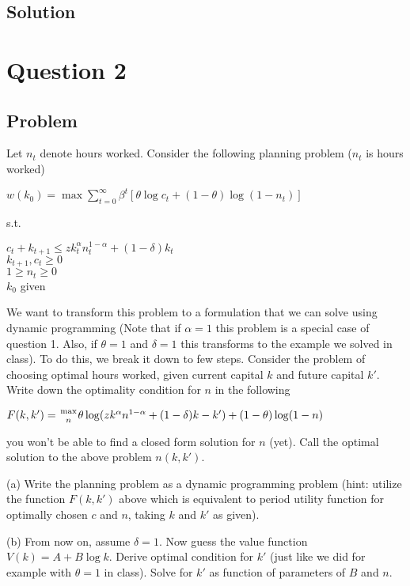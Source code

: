 \documentclass[10pt, a4paper]{article}
\begin{document}
  \subsection*{Solution}
    
\section{Question 2}
  \subsection{Problem}
    Let $n_t$ denote hours worked. Consider the following planning problem ($n_t$ is hours worked)
    \begin{center}
      $w(k_0) = \max\sum_{t=0}^{\infty}\beta^t[\theta\log c_t+(1-\theta)\log(1-n_t)]$
    \end{center}
    s.t.
    \begin{center}
      $c_t+k_{t+1}\leq zk_t^{\alpha}n_t^{1-\alpha}+(1-\delta)k_t$ \\
      $k_{t+1},c_t\geq 0$ \\
      $1\geq n_t\geq 0$ \\
      $k_0$ given
    \end{center}

    We want to transform this problem to a formulation that we can solve using dynamic programming (Note that if $\alpha=1$ this problem is a special case of question 1. Also, if $\theta=1$ and $\delta=1$ this transforms to the example we solved in class). To do this, we break it down to few steps. Consider the problem of choosing optimal hours worked, given current capital $k$ and future capital $k'$. Write down the optimality condition for $n$ in the following
    \begin{center}
      $F(k,k')={\max\atop{n}}\theta\log(zk^{\alpha}n^{1-\alpha}+(1-\delta)k-k')+(1-\theta)\log(1-n)$
    \end{center}
    you won't be able to find a closed form solution for $n$ (yet). Call the optimal solution to the above problem $n(k,k')$.

    (a) Write the planning problem as a dynamic programming problem (hint: utilize the function $F(k,k')$ above which is equivalent to period utility function for optimally chosen $c$ and $n$, taking $k$ and $k'$ as given).

    (b) From now on, assume $\delta=1$. Now guess the value function $V(k)=A+B\log k$. Derive optimal condition for $k'$ (just like we did for example with $\theta=1$ in class). Solve for $k'$ as function of parameters of $B$ and $n$.
\end{document}
